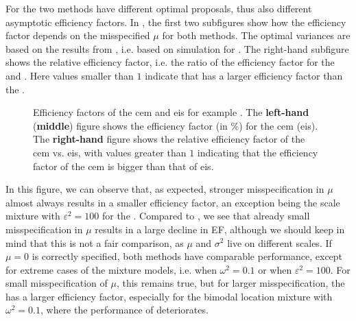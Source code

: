For  the two methods have different optimal proposals, thus also different asymptotic efficiency factors. In , the first two subfigures show how the efficiency factor depends on the misspecified $\mu$ for both methods. The optimal variances are based on the results from , i.e. based on simulation for \aeis. The right-hand subfigure shows the relative efficiency factor, i.e. the ratio of the efficiency factor for the \acem and \aeis. Here values smaller than $1$ indicate that \aeis has a larger efficiency factor than the \acem. 

\begin{figure}
    \centering

    \resizebox{\textwidth}{!}{%
    }
    \caption{Efficiency factors of the \acrshort{cem} and \acrshort{eis} for example . The \textbf{left-hand} (\textbf{middle}) figure shows the efficiency factor (in \%) for the \acrshort{cem} (\acrshort{eis}). The \textbf{right-hand} figure shows the relative efficiency factor of the \acrshort{cem} vs. \acrshort{eis}, with values greater than $1$ indicating that the efficiency factor of the \acrshort{cem} is bigger than that of \acrshort{eis}.} 
    \label{fig:rho}
\end{figure} 

In this figure, we can observe that, as expected, stronger misspecification in $\mu$ almost always results in a smaller efficiency factor, an exception being the scale mixture with $\varepsilon^{2} = 100$ for the \acem. 
Compared to , we see that already small misspecification in $\mu$ results in a large decline in EF, although we should keep in mind that this is not a fair comparison, as $\mu$ and $\sigma^{2}$ live on different scales.
If $\mu = 0 $ is correctly specified, both methods have comparable performance, except for extreme cases of the mixture models, i.e. when $\omega^{2} = 0.1$ or when $\varepsilon^{2} = 100$. 
For small misspecification of $\mu$, this remains true, but for larger misspecification, the \acem has a larger efficiency factor, especially for the bimodal location mixture with $\omega^{2} = 0.1$, where the performance of \aeis deteriorates. 


